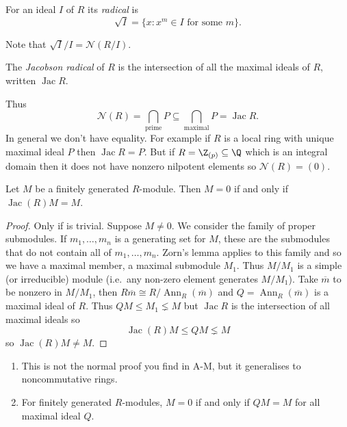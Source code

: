 \documentclass[a4paper]{article}
\DeclareMathOperator{\Ann}{Ann} %
\newcommand{\nilrad}[1]{\mathcal{N}({#1})} %
\DeclareMathOperator{\jac}{Jac} %
\begin{document}
\begin{definition}[radical]
  For an ideal \(I\) of \(R\) its \emph{radical} is
  \[
    \sqrt I = \{x: x^m \in I \text{ for some } m\}.
  \]
\end{definition}
Note that \(\sqrt I /I = \nilrad{R/I}\).

\begin{definition}
  The \emph{Jacobson radical} of \(R\) is the intersection of all the maximal ideals of \(R\), written \(\jac R\).
\end{definition}
Thus
\[
  \nilrad R = \bigcap_{\text{prime}} P \subseteq \bigcap_{\text{maximal}} P = \jac R.
\]
In general we don't have equality. For example if \(R\) is a local ring with unique maximal ideal \(P\) then \(\jac R = P\). But if \(R = \Z_{(p)} \subseteq \Q\) which is an integral domain then it does not have nonzero nilpotent elements so \(\nilrad R = (0)\).

\begin{proposition}
  Let \(M\) be a finitely generated \(R\)-module. Then \(M = 0\) if and only if \(\jac(R) M = M\).
\end{proposition}

\begin{proof}
  Only if is trivial. Suppose \(M \neq 0\). We consider the family of proper submodules. If \(m_1, \dots, m_n\) is a generating set for \(M\), these are the submodules that do not contain all of \(m_1, \dots, m_n\). Zorn's lemma applies to this family and so we have a maximal member, a maximal submodule \(M_1\). Thus \(M/M_1\) is a simple (or irreducible) module (i.e.\ any non-zero element generates \(M/M_1\)). Take \(\overline m\) to be nonzero in \(M/M_1\), then \(R \overline m \cong R/\Ann_R(\overline m)\) and \(Q = \Ann_R(\overline m)\) is a maximal ideal of \(R\). Thus \(QM \leq M_1 \lneq M\) but \(\jac R\) is the intersection of all maximal ideals so
  \[
    \jac(R)M \leq QM \lneq M
  \]
  so \(\jac(R)M \neq M\).
\end{proof}

\begin{remark}\leavevmode
  \begin{enumerate}
  \item This is not the normal proof you find in A-M, but it generalises to noncommutative rings.
  \item For finitely generated \(R\)-modules, \(M = 0\) if and only if \(QM = M\) for all maximal ideal \(Q\).
  \end{enumerate}
\end{remark}
\end{document}
